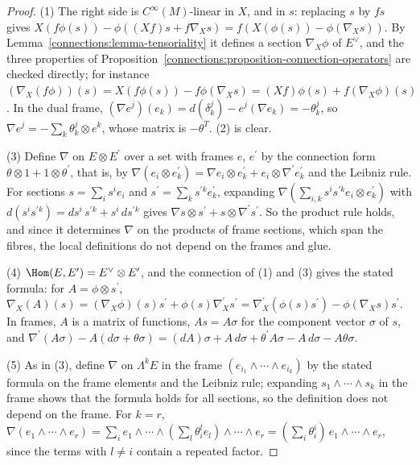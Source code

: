 \begin{proof}
(1) The right side is $C^\infty(M)$-linear in $X$, and in $s$: replacing $s$ by $fs$ gives $X(f\phi(s)) - \phi((Xf)s + f\nabla_Xs) = f(X(\phi(s)) - \phi(\nabla_Xs))$. By
Lemma~\ref{connections:lemma-tensoriality} it defines a section $\nabla_X\phi$ of $E^\vee$, and the three properties of
Proposition~\ref{connections:proposition-connection-operators} are checked directly; for instance $(\nabla_X(f\phi))(s) = X(f\phi(s)) - f\phi(\nabla_Xs) = (Xf)\phi(s) + f(\nabla_X\phi)(s)$.
In the dual frame, $(\nabla e^j)(e_k) = d(\delta^j_k) - e^j(\nabla e_k) = -\theta^j_k$, so $\nabla e^j = -\sum_k\theta^j_k \otimes e^k$, whose matrix is $-\theta^T$. (2) is clear.

(3) Define $\nabla$ on $E \otimes E^{\prime}$ over a set with frames $e$, $e^{\prime}$ by the connection form $\theta \otimes 1 + 1 \otimes \theta^{\prime}$, that is, by
$\nabla(e_i \otimes e^{\prime}_k) = \nabla e_i \otimes e^{\prime}_k + e_i \otimes \nabla^{\prime}e^{\prime}_k$ and the Leibniz rule. For sections $s = \sum_is^ie_i$ and
$s^{\prime} = \sum_ks^{\prime k}e^{\prime}_k$, expanding $\nabla(\sum_{i,k}s^is^{\prime k}e_i \otimes e^{\prime}_k)$ with $d(s^is^{\prime k}) = ds^i\,s^{\prime k} + s^i\,ds^{\prime k}$ gives
$\nabla s \otimes s^{\prime} + s \otimes \nabla^{\prime}s^{\prime}$. So the product rule holds, and since it determines $\nabla$ on the products of frame sections, which span the fibres,
the local definitions do not depend on the frames and glue.

(4) $\Hom(E, E^{\prime}) = E^\vee \otimes E^{\prime}$, and the connection of (1) and (3) gives the stated formula: for $A = \phi \otimes s^{\prime}$,
$\nabla_X(A)(s) = (\nabla_X\phi)(s)s^{\prime} + \phi(s)\nabla^{\prime}_Xs^{\prime} = \nabla^{\prime}_X(\phi(s)s^{\prime}) - \phi(\nabla_Xs)s^{\prime}$. In frames, $A$ is a matrix of functions,
$As = A\sigma$ for the component vector $\sigma$ of $s$, and $\nabla^{\prime}(A\sigma) - A(d\sigma + \theta\sigma) = (dA)\sigma + A\,d\sigma + \theta^{\prime}A\sigma - A\,d\sigma - A\theta\sigma$.

(5) As in (3), define $\nabla$ on $\Lambda^kE$ in the frame $(e_{i_1} \wedge \cdots \wedge e_{i_k})$ by the stated formula on the frame elements and the Leibniz rule; expanding
$s_1 \wedge \cdots \wedge s_k$ in the frame shows that the formula holds for all sections, so the definition does not depend on the frame. For $k = r$,
$\nabla(e_1 \wedge \cdots \wedge e_r) = \sum_ie_1 \wedge \cdots \wedge (\sum_l\theta^l_ie_l) \wedge \cdots \wedge e_r = (\sum_i\theta^i_i)\,e_1 \wedge \cdots \wedge e_r$, since the terms with
$l \neq i$ contain a repeated factor.
\end{proof}

